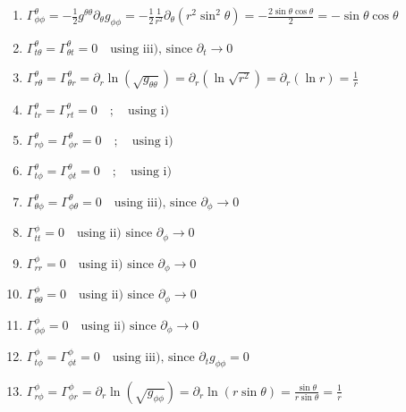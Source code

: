 \documentclass[12pt]{report}
\begin{document}
\begin{enumerate}
		\item $\Gamma^{\theta}_{\phi\phi} = -\frac{1}{2} g^{\theta\theta} \partial_{\theta} g_{\phi\phi} = -\frac{1}{2} \frac{1}{r^2} \partial_{\theta} (r^2\sin^2\theta) = -\frac{2\sin\theta\cos\theta}{2} = -\sin\theta\cos\theta$ 
		
		\item $\Gamma^{\theta}_{t\theta} = \Gamma^{\theta}_{\theta t} = 0 \quad \text{using iii), since } \partial_t \to 0$ 
		
		\item $ \Gamma^{\theta}_{r\theta} = \Gamma^{\theta}_{\theta r} = \partial_r \ln(\sqrt{g_{\theta\theta}}) = \partial_r(\ln \sqrt{r^2}) = \partial_r(\ln r) = \frac{1}{r}$ 
		
		\item $\Gamma^{\theta}_{tr} = \Gamma^{\theta}_{rt} = 0 \quad ; \quad \text{using i)}$ 
		
		\item $\Gamma^{\theta}_{r\phi} = \Gamma^{\theta}_{\phi r}=0\quad;\quad \text{using i)}$
		
		\item $\Gamma^{\theta}_{t\phi} = \Gamma^{\theta}_{\phi t} = 0 \quad;\quad \text{using i)}$ 
		
		\item $\Gamma^{\theta}_{\theta\phi} = \Gamma^{\theta}_{\phi\theta} = 0 \quad \text{using iii), since } \partial_{\phi} \to 0$ 
		
		\item $\Gamma^{\phi}_{tt} = 0 \quad \text{using ii)} \text{ since } \partial_{\phi} \to 0$ 
		
		\item $\Gamma^{\phi}_{rr} = 0 \quad \text{using ii)} \text{ since } \partial_{\phi} \to 0$ 
		
		\item $\Gamma^{\phi}_{\theta\theta} = 0 \quad \text{using ii)} \text{ since } \partial_{\phi} \to 0$
		
		\item $\Gamma^{\phi}_{\phi\phi} = 0 \quad \text{using ii)} \text{ since } \partial_{\phi} \to 0$
		
		\item $\Gamma^{\phi}_{t\phi} = \Gamma^{\phi}_{\phi t} = 0 \quad \text{using iii), since } \partial_t g_{\phi\phi} = 0$ 
		
		\item $\Gamma^{\phi}_{r\phi} = \Gamma^{\phi}_{\phi r} = \partial_r \ln(\sqrt{g_{\phi\phi}}) = \partial_r \ln(r\sin\theta) = \frac{\sin\theta}{r\sin\theta} = \frac{1}{r}$ 
		

\end{enumerate}
\end{document}
